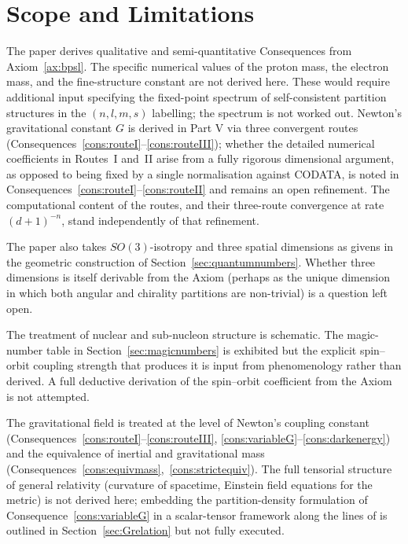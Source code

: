 \documentclass[11pt,twocolumn,a4paper]{article}
\theoremstyle{axiomstyle}
\theoremstyle{conseqstyle}
\theoremstyle{definition}
\theoremstyle{remark}
\begin{document}
\section{Scope and Limitations}
\label{sec:scope}

The paper derives qualitative and semi-quantitative Consequences from Axiom~\ref{ax:bpsl}. The specific numerical values of the proton mass, the electron mass, and the fine-structure constant are not derived here. These would require additional input specifying the fixed-point spectrum of self-consistent partition structures in the $(n,l,m,s)$ labelling; the spectrum is not worked out. Newton's gravitational constant $G$ is derived in Part V via three convergent routes (Consequences~\ref{cons:routeI}--\ref{cons:routeIII}); whether the detailed numerical coefficients in Routes~I and~II arise from a fully rigorous dimensional argument, as opposed to being fixed by a single normalisation against CODATA, is noted in Consequences~\ref{cons:routeI}--\ref{cons:routeII} and remains an open refinement. The computational content of the routes, and their three-route convergence at rate $(d+1)^{-n}$, stand independently of that refinement.

The paper also takes $SO(3)$-isotropy and three spatial dimensions as givens in the geometric construction of Section~\ref{sec:quantumnumbers}. Whether three dimensions is itself derivable from the Axiom (perhaps as the unique dimension in which both angular and chirality partitions are non-trivial) is a question left open.

The treatment of nuclear and sub-nucleon structure is schematic. The magic-number table in Section~\ref{sec:magicnumbers} is exhibited but the explicit spin--orbit coupling strength that produces it is input from phenomenology rather than derived. A full deductive derivation of the spin--orbit coefficient from the Axiom is not attempted.

The gravitational field is treated at the level of Newton's coupling constant (Consequences~\ref{cons:routeI}--\ref{cons:routeIII}, \ref{cons:variableG}--\ref{cons:darkenergy}) and the equivalence of inertial and gravitational mass (Consequences~\ref{cons:equivmass},~\ref{cons:strictequiv}). The full tensorial structure of general relativity (curvature of spacetime, Einstein field equations for the metric) is not derived here; embedding the partition-density formulation of Consequence~\ref{cons:variableG} in a scalar-tensor framework along the lines of \citet{brans1961} is outlined in Section~\ref{sec:Grelation} but not fully executed.
\end{document}
